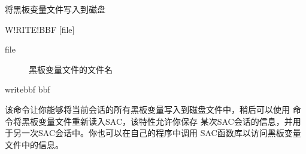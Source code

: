 \label{cmd:writebbf}

将黑板变量文件写入到磁盘

\begin{SACSTX}
W!RITE!BBF [file]
\end{SACSTX}

\begin{description}
\item [file] 黑板变量文件的文件名
\end{description}

\begin{SACDFT}
writebbf bbf
\end{SACDFT}

该命令让你能够将当前会话的所有黑板变量写入到磁盘文件中，稍后可以使用
 命令将黑板变量文件重新读入SAC，该特性允许你保存
某次SAC会话的信息，并用于另一次SAC会话中。你也可以在自己的程序中调用
SAC函数库以访问黑板变量文件中的信息。
